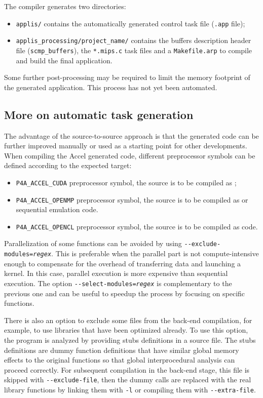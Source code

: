 \documentclass[a4paper]{article}
\begin{document}
The compiler generates two directories:
\begin{itemize}
\item \texttt{applis/}  contains the automatically generated control task file (\texttt{.app} file);
\item \texttt{applis\_processing/project\_name/} contains the buffers
  description header file (\texttt{scmp\_buffers}), the
  \texttt{*.mips.c} task files and a \texttt{Makefile.arp} to compile
  and build the final application.
\end{itemize}

Some further post-processing may be required to limit the memory
footprint of the generated application. This process has not yet been
automated.

\subsection{More on \protect\Apfa automatic task generation}

The advantage of the source-to-source approach is that the
generated code can be further improved manually or used as a starting
point for other
developments. When compiling the \Apfa Accel generated code,
different preprocessor symbols can be defined according to the expected target:
\begin{itemize}
\item \verb|P4A_ACCEL_CUDA| preprocessor symbol, the source is to be
  compiled as \Acuda;
\item \verb|P4A_ACCEL_OPENMP| preprocessor symbol, the source is to be
  compiled as \Aopenmp or sequential emulation code.
\item \verb|P4A_ACCEL_OPENCL| preprocessor symbol, the source is to be
  compiled as \Aopencl code.
\end{itemize}

Parallelization of some functions can be avoided by using
\texttt{-{}-exclude-modules=\emph{regex}}. This is preferable when the
parallel part is not compute-intensive enough to compensate for
the overhead of transferring data and launching a kernel. In this
case, parallel execution is more expensive than sequential execution. 
The option \texttt{-{}-select-modules=\emph{regex}} is complementary to the
previous one and can be useful to speedup the process by focusing on specific
functions.

There is also an option to exclude some files from the back-end
compilation, for example, to use libraries that have been optimized
already. To use this option,
the program is analyzed by providing stubs definitions in a source
file. The stubs definitions
are dummy function definitions that have similar global memory
effects to the original functions so that \Apips global
interprocedural analysis can proceed correctly. For subsequent compilation
in the back-end stage, this file is skipped with \verb|--exclude-file|, then
the dummy calls are replaced with the real library functions by linking
them with \texttt{-l} or compiling them with \verb|--extra-file|.
\end{document}
